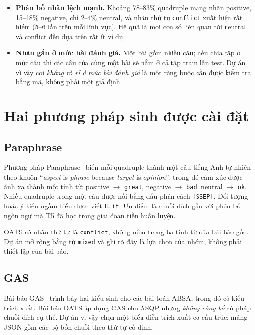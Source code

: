 \documentclass[12pt,a4paper]{report}
\newcommand{\enquote}[1]{“#1”}
\newcommand{\code}[1]{\texttt{#1}}
\begin{document}
\begin{itemize}
  \item \textbf{Phân bố nhãn lệch mạnh.} Khoảng 78--83\% quadruple mang nhãn positive, 15--18\% negative, chỉ 2--4\%
        neutral, và nhãn thứ tư \code{conflict} xuất hiện rất hiếm (5--6 lần trên mỗi lĩnh vực). Hệ quả là mọi con số
        liên quan tới neutral và conflict đều dựa trên rất ít ví dụ.
  \item \textbf{Nhãn gắn ở mức bài đánh giá.} Một bài gồm nhiều câu; nếu chia tập ở mức câu thì các câu của cùng một bài
        sẽ nằm ở cả tập train lẫn test. Dự án vì vậy coi \emph{không rò rỉ ở mức bài đánh giá} là một ràng buộc cần được
        kiểm tra bằng mã, không phải một giả định.
\end{itemize}

\section{Hai phương pháp sinh được cài đặt}

\subsection{Paraphrase}

Phương pháp Paraphrase~\cite{paraphrase2021} biến mỗi quadruple thành một câu tiếng Anh tự nhiên theo khuôn
\enquote{\textit{aspect} is \textit{phrase} because \textit{target} is \textit{opinion}}, trong đó cảm xúc được ánh xạ
thành một tính từ: positive $\rightarrow$ \code{great}, negative $\rightarrow$ \code{bad}, neutral $\rightarrow$ \code{ok}.
Nhiều quadruple trong một câu được nối bằng dấu phân cách \code{[SSEP]}. Đối tượng hoặc ý kiến ngầm hiểu được viết là
\code{it}. Ưu điểm là chuỗi đích gần với phân bố ngôn ngữ mà T5 đã học trong giai đoạn tiền huấn luyện.

OATS có nhãn thứ tư là \code{conflict}, không nằm trong ba tính từ của bài báo gốc. Dự án mở rộng bằng từ \code{mixed} và
ghi rõ đây là lựa chọn của nhóm, không phải thiết lập của bài báo.

\subsection{GAS}

Bài báo GAS~\cite{gas2021} trình bày hai kiểu sinh cho các bài toán ABSA, trong đó có kiểu trích xuất. Bài báo OATS áp
dụng GAS cho ASQP nhưng \emph{không công bố} cú pháp chuỗi đích cụ thể. Dự án vì vậy chọn một biểu diễn trích xuất có
cấu trúc: mảng JSON gồm các bộ bốn chuỗi theo thứ tự cố định.
\end{document}
